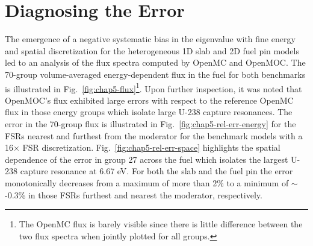 \clearpage



\section{Diagnosing the Error}
\label{sec:chap5-diagnosis}

The emergence of a negative systematic bias in the eigenvalue with fine energy and spatial discretization for the heterogeneous 1D slab and 2D fuel pin models led to an analysis of the flux spectra computed by OpenMC and OpenMOC. The 70-group volume-averaged energy-dependent flux in the fuel for both benchmarks is illustrated in Fig.~\ref{fig:chap5-flux}\footnote{The OpenMC flux is barely visible since there is little difference between the two flux spectra when jointly plotted for all groups.}. Upon further inspection, it was noted that OpenMOC's flux exhibited large errors with respect to the reference OpenMC flux in those energy groups which isolate large U-238 capture resonances. The error in the 70-group flux is illustrated in Fig.~\ref{fig:chap5-rel-err-energy} for the \ac{FSR}s nearest and furthest from the moderator for the benchmark models with a 16$\times$ \ac{FSR} discretization. Fig.~\ref{fig:chap5-rel-err-space} highlights the spatial dependence of the error in group 27 across the fuel which isolates the largest U-238 capture resonance at 6.67 eV. For both the slab and the fuel pin the error monotonically decreases from a maximum of more than 2\% to a minimum of $\sim$-0.3\% in those \ac{FSR}s furthest and nearest the moderator, respectively. 

